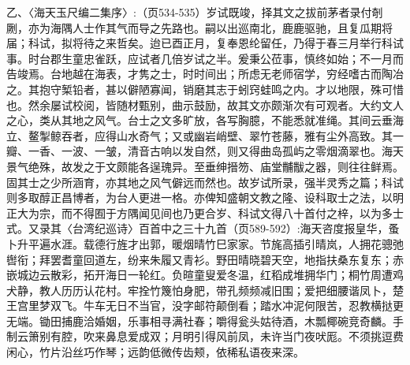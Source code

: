 \noindent 乙、〈海天玉尺编二集序〉:（页534-535）岁试既竣，择其文之拔前茅者录付剞劂，亦为海隅人士作其气而导之先路也。嗣以出巡南北，鹿鹿驱驰，且复瓜期将届；科试，拟将待之来哲矣。迨已酉正月，复奉恩纶留任，乃得于春三月举行科试事。时台郡生童忠雀跃，应试者几倍岁试之半。爰秉公莅事，慎终如始；不一月而告竣焉。台地越在海表，才隽之士，时时间出；所虑无老师宿学，穷经嗜古而陶冶之。其抱守椠铅者，甚以僻陋寡闻，销磨其志于蚓窍蛙鸣之内。才以地限，殊可惜也。然余屡试校阅，皆随材甄别，曲示鼓励，故其文亦颇渐次有可观者。大约文人之心，类从其地之风气。台士之文多旷放，各写胸臆，不能悉就准绳。其间云垂海立、鳌掣鲸吞者，应得山水奇气；又或幽岩峭壁、翠竹苍藤，雅有尘外高致。其一瓣、一香、一波、一皱，清音古响以发自然，则又得曲岛孤屿之零烟滴翠也。海天景气绝殊，故发之于文颇能各逞瑰异。至垂绅搢笏、庙堂黼黻之器，则往往鲜焉。固其士之少所涵育，亦其地之风气僻远而然也。故岁试所录，强半灵秀之篇；科试则多取醇正昌博者，为台人更进一格。亦俾知盛朝文教之隆、设科取士之法，以明正大为宗，而不得囿于方隅闻见间也乃更合岁、科试文得八十首付之梓，以为多士式。又录其〈台湾纪巡诗〉百首中之三十九首（页589-592）:海天咨度报皇华，蚤卜升平遍水涯。载德行旌才出郭，暖烟晴竹巳家家。节旄高插引晴岚，人拥花骢弛辔衔；拜罢耆童回道左，纷来朱履又青衫。野田晴晓碧天空，地指扶桑东复东；赤嵌城边云散彩，拓开海日一轮红。负暄童叟爱冬温，红稻成堆拥华门；桐竹周遭鸡犬静，教人历历认花村。牢拴竹篾怕身肥，带孔频频减旧围；爱把细腰谐凤卜，楚王宫里梦双飞。牛车无日不当官，没字邮符颠倒看；踏水冲泥何限苦，忍教横挞更无端。锄田捕鹿洽婚姻，乐事相寻满社春；嚼得瓮头姑待酒，木瓢椰碗竞奇麟。手制云箫别有腔，吹来鼻息爱成双；月明引得风前凤，未许当门夜吠厖。不须挑逗费闲心，竹片沿丝巧作琴；远韵低微传齿颊，依稀私语夜来深。


